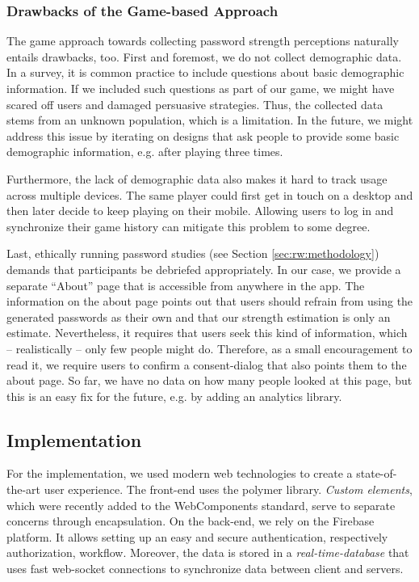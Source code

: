 \subsubsection{Drawbacks of the Game-based Approach}
The game approach towards collecting password strength perceptions naturally entails drawbacks, too. First and foremost, we do not collect demographic data. In a survey, it is common practice to include questions about basic demographic information. If we included such questions as part of our game, we might have scared off users and damaged persuasive strategies. Thus, the collected data stems from an unknown population, which is a limitation. In the future, we might address this issue by iterating on designs that ask people to provide some basic demographic information, e.g. after playing three times. 

Furthermore, the lack of demographic data also makes it hard to track usage across multiple devices. The same player could first get in touch on a desktop and then later decide to keep playing on their mobile. Allowing users to log in and synchronize their game history can mitigate this problem to some degree.

Last, ethically running password studies (see Section \ref{sec:rw:methodology}) demands that participants be debriefed appropriately. In our case, we provide a separate ``About'' page that is accessible from anywhere in the app. The information on the about page points out that users should refrain from using the generated passwords as their own and that our strength estimation is only an estimate. Nevertheless, it requires that users seek this kind of information, which -- realistically -- only few people might do. Therefore, as a small encouragement to read it, we require users to confirm a consent-dialog that also points them to the about page. So far, we have no data on how many people looked at this page, but this is an easy fix for the future, e.g. by adding an analytics library. 

\subsection{Implementation}
For the implementation, we used modern web technologies to create a state-of-the-art user experience. The front-end uses the polymer library. \textit{Custom elements}, which were recently added to the WebComponents standard, serve to separate concerns through encapsulation. On the back-end, we rely on the Firebase platform. It allows setting up an easy and secure authentication, respectively authorization, workflow. Moreover, the data is stored in a \textit{real-time-database} that uses fast web-socket connections to synchronize data between client and servers.


